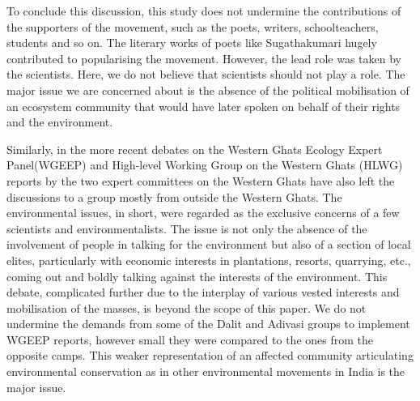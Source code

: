 \documentclass[twoside, 13pt]{article}
\begin{document}
{{{{To conclude this discussion, this study does not undermine the contributions of the supporters of the movement, such as the poets, writers, schoolteachers, students and so on. The literary works of poets like Sugathakumari hugely contributed to popularising the movement. However, the lead role was taken by the scientists. Here, we do not believe that scientists should not play a role. The major issue we are concerned about is the absence of the political mobilisation of an ecosystem community that would have later spoken on behalf of their rights and the environment.

Similarly, in the more recent debates on the Western Ghats Ecology Expert Panel\break (WGEEP) and High-level Working Group on the Western Ghats (HLWG) reports by the two expert committees on the Western Ghats have also left the discussions to a group mostly from outside the Western Ghats. The environmental issues, in short, were regarded as the exclusive concerns of a few scientists and environmentalists. The issue is not only the absence of the involvement of people in talking for the environment but also of a section of local elites, particularly with economic interests in plantations, resorts, quarrying, etc., coming out and boldly talking against the interests of the environment. This debate, complicated further due to the interplay of various vested interests and mobilisation of the masses, is beyond the scope of this paper. We do not undermine the demands from some of the Dalit and Adivasi groups to implement WGEEP reports, however small they were compared to the ones from the opposite camps. This weaker representation of an affected community articulating environmental conservation as in other environmental movements in India is the major issue.

\newpage

}}}}
\end{document}
